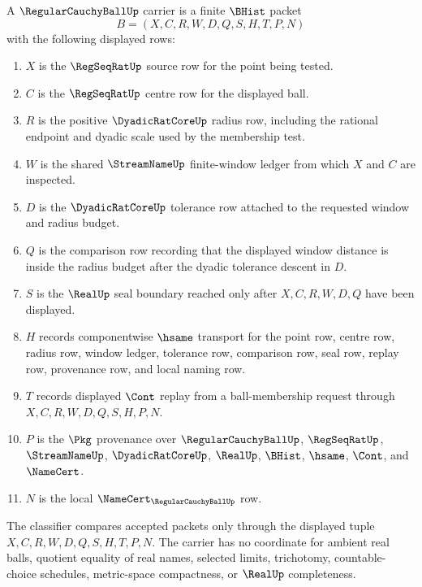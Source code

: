 \begin{definition}
\label{def:regular-cauchy-ball-carrier}
A $\RegularCauchyBallUp$ carrier is a finite $\BHist$ packet
$$
B=(X,C,R,W,D,Q,S,H,T,P,N)
$$
with the following displayed rows:
\begin{enumerate}
\item $X$ is the $\RegSeqRatUp$ source row for the point being tested.
\item $C$ is the $\RegSeqRatUp$ centre row for the displayed ball.
\item $R$ is the positive $\DyadicRatCoreUp$ radius row, including the rational endpoint and dyadic scale used by the membership test.
\item $W$ is the shared $\StreamNameUp$ finite-window ledger from which $X$ and $C$ are inspected.
\item $D$ is the $\DyadicRatCoreUp$ tolerance row attached to the requested window and radius budget.
\item $Q$ is the comparison row recording that the displayed window distance is inside the radius budget after the dyadic tolerance descent in $D$.
\item $S$ is the $\RealUp$ seal boundary reached only after $X,C,R,W,D,Q$ have been displayed.
\item $H$ records componentwise $\hsame$ transport for the point row, centre row, radius row, window ledger, tolerance row, comparison row, seal row, replay row, provenance row, and local naming row.
\item $T$ records displayed $\Cont$ replay from a ball-membership request through $X,C,R,W,D,Q,S,H,P,N$.
\item $P$ is the $\Pkg$ provenance over $\RegularCauchyBallUp$, $\RegSeqRatUp$, $\StreamNameUp$, $\DyadicRatCoreUp$, $\RealUp$, $\BHist$, $\hsame$, $\Cont$, and $\NameCert$.
\item $N$ is the local $\NameCert_{\RegularCauchyBallUp}$ row.
\end{enumerate}
The classifier compares accepted packets only through the displayed tuple $X,C,R,W,D,Q,S,H,T,P,N$. The carrier has no coordinate for ambient real balls, quotient equality of real names, selected limits, trichotomy, countable-choice schedules, metric-space compactness, or $\RealUp$ completeness.
\end{definition}

